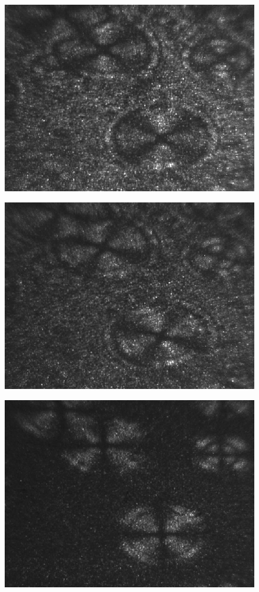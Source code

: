 \documentclass[11pt,a4]{jarticle}
\begin{document}
\begin{figure}[htbp]
   \begin{center}
    \includegraphics[width=0.7\hsize]{./conichol.eps}
    \caption{}
     \label{fig:conichol}
   \end{center}
\end{figure}
\begin{figure}[htbp]
   \begin{center}
    \includegraphics[width=0.7\hsize]{./45nichol.eps}
    \caption{}
     \label{fig:45nichol}
   \end{center}
\end{figure}
\begin{figure}[htbp]
   \begin{center}
    \includegraphics[width=0.7\hsize]{./cross-nichol1.eps}
    \caption{}
     \label{fig:crossnichol1}
   \end{center}
\end{figure}
\end{document}
